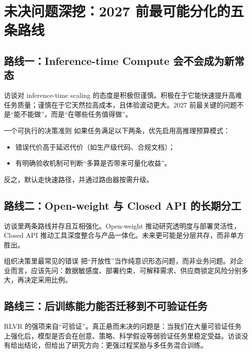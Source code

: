 \section{未决问题深挖：2027 前最可能分化的五条路线}

\subsection{路线一：Inference-time Compute 会不会成为新常态}

访谈对 inference-time scaling 的态度是积极但谨慎。积极在于它能快速提升高难任务质量；谨慎在于它天然拉高成本，且体验波动更大。2027 前最关键的问题不是“能不能做”，而是“在哪些任务值得做”。

\begin{importantbox}{一个可执行的决策准则}
如果任务满足以下两条，优先启用高推理预算模式：
\begin{itemize}[leftmargin=1.5em]
    \item 错误代价高于延迟代价（如生产级代码、合规文档）；
    \item 有明确验收机制可判断“多算是否带来可量化收益”。
\end{itemize}
反之，默认走快速路径，并通过路由器按需升级。
\end{importantbox}

\subsection{路线二：Open-weight 与 Closed API 的长期分工}

访谈里两条路线并存且互相强化。Open-weight 推动研究透明度与部署灵活性，Closed API 推动工具深度整合与产品一体化。未来更可能是分层共存，而非单方胜出。

\begin{warningbox}{组织决策里最常见的错误}
把“开放性”当作纯意识形态问题，而非业务问题。对企业而言，应该先问：数据敏感度、部署约束、可解释需求、供应商锁定风险分别多大，再决定采用比例。
\end{warningbox}

\subsection{路线三：后训练能力能否迁移到不可验证任务}

RLVR 的强项来自“可验证”。真正悬而未决的问题是：当我们在大量可验证任务上强化后，模型是否会在创意、策略、科学假设等弱验证任务里稳定受益。访谈没有给出结论，但给出了研究方向：更强过程奖励与多任务混合训练。

